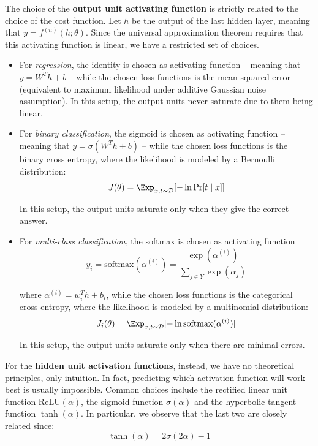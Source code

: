 \documentclass[a4paper, 12pt]{report}
\begin{document}
    The choice of the \textbf{output unit activating function} is strictly related to the choice of the cost function. Let $h$ be the output of the last hidden layer, meaning that $y = f^{(n)}(h; \theta)$. Since the universal approximation theorem requires that this activating function is linear, we have a restricted set of choices.
    \begin{itemize}
        \item For \textit{regression}, the identity is chosen as activating function -- meaning that $y = W^Th + b$ -- while the chosen loss functions is the mean squared error (equivalent to maximum likelihood under additive Gaussian noise assumption). In this setup, the output units never saturate due to them being linear.
        
        \item For \textit{binary classification}, the sigmoid is chosen as activating function -- meaning that $y = \sigma(W^Th + b)$ -- while the chosen loss functions is the binary cross entropy, where the likelihood is modeled by a Bernoulli distribution:
        \[J(\theta) = \Exp_{x,t \sim \mathcal{D}} [-\ln \Pr[t \mid x]]\]

        In this setup, the output units saturate only when they give the correct answer.

        \item For \textit{multi-class classification}, the softmax is chosen as activating function
        \[y_i = \mathrm{softmax}(\alpha^{(i)}) = \frac{\exp(\alpha^{(i)})}{\sum_{j \in Y} \exp(\alpha_j)}\]

        where $\alpha^{(i)} = w_i^Th+b_i$, while the chosen loss functions is the categorical cross entropy, where the likelihood is modeled by a multinomial distribution:
        \[J_i(\theta) = \Exp_{x,t \sim \mathcal{D}} [-\ln \mathrm{softmax}(\alpha^{(i)})]\]

        In this setup, the output units saturate only when there are minimal errors.
    \end{itemize}

    For the \textbf{hidden unit activation functions}, instead, we have no theoretical principles, only intuition. In fact, predicting which activation function will work best is usually impossible. Common choices include the rectified linear unit function $\mathrm{ReLU}(\alpha)$, the sigmoid function $\sigma(\alpha)$ and the hyperbolic tangent function $\tanh(\alpha)$. In particular, we observe that the last two are closely related since:
    \[\tanh(\alpha)= 2\sigma(2\alpha)-1\]
\end{document}
